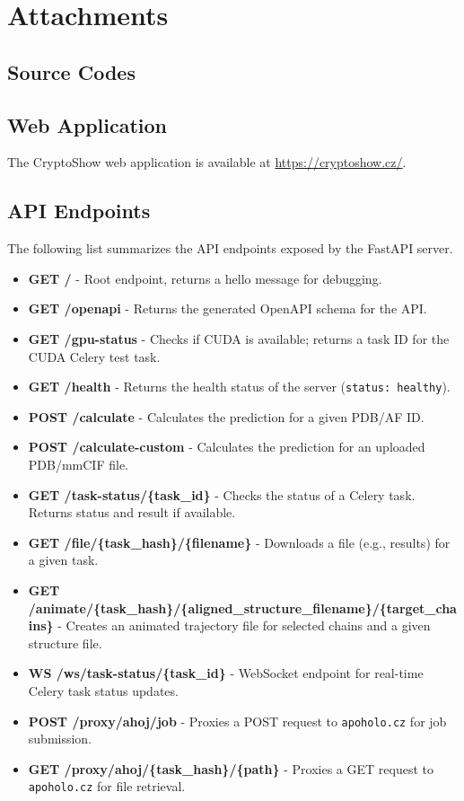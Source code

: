 \chapter{Attachments}

\section{Source Codes}
\label{sec:source-codes}


\section{Web Application}
\label{sec:web-application}

The CryptoShow web application is available at \url{https://cryptoshow.cz/}.

\section{API Endpoints}
\label{sec:api-endpoints}

The following list summarizes the API endpoints exposed by the FastAPI server.

\begin{itemize}
    \item \textbf{GET /} - Root endpoint, returns a hello message for debugging.
    \item \textbf{GET /openapi} - Returns the generated OpenAPI schema for the API.
    \item \textbf{GET /gpu-status} - Checks if CUDA is available; returns a task ID for the CUDA Celery test task.
    \item \textbf{GET /health} - Returns the health status of the server (\lstinline|status: healthy|).
    \item \textbf{POST /calculate} - Calculates the prediction for a given PDB/AF ID.
    \item \textbf{POST /calculate-custom} - Calculates the prediction for an uploaded PDB/mmCIF file.
    \item \textbf{GET /task-status/\{task\_id\}} - Checks the status of a Celery task. Returns status and result if available.
    \item \textbf{GET /file/\{task\_hash\}/\{filename\}} - Downloads a file (e.g., results) for a given task.
    \item \textbf{GET /animate/\{task\_hash\}/\{aligned\_structure\_filename\}\-/\{target\_chains\}} - Creates an animated trajectory file for selected chains and a given structure file.
    \item \textbf{WS /ws/task-status/\{task\_id\}} - WebSocket endpoint for real-time Celery task status updates.
    \item \textbf{POST /proxy/ahoj/job} - Proxies a POST request to \lstinline|apoholo.cz| for job submission.
    \item \textbf{GET /proxy/ahoj/\{task\_hash\}/\{path\}} - Proxies a GET request to \lstinline|apoholo.cz| for file retrieval.
\end{itemize}
